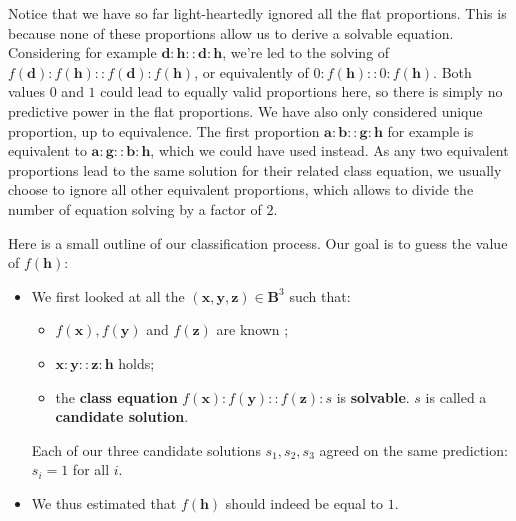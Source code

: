 Notice that we have so far light-heartedly ignored  all the flat proportions.
This is because none of these proportions allow us to derive a solvable
equation. Considering for example $\mathbf{d} : \mathbf{h} :: \mathbf{d} :
\mathbf{h}$, we're led to the solving of $f(\mathbf{d}) : f(\mathbf{h}) ::
f(\mathbf{d}) : f(\mathbf{h})$, or equivalently of $0 : f(\mathbf{h}) :: 0 :
f(\mathbf{h})$. Both values $0$ and $1$ could lead to equally valid proportions
here, so there is simply no predictive power in the flat proportions. We have
also only considered unique proportion, up to equivalence. The first proportion
$\mathbf{a} : \mathbf{b} :: \mathbf{g} : \mathbf{h}$ for example is equivalent
to $\mathbf{a} : \mathbf{g} :: \mathbf{b} : \mathbf{h}$, which we could have
used instead. As any two equivalent proportions lead to the same solution for
their related class equation, we usually choose to ignore all other equivalent
proportions, which allows to divide the number of equation solving by a factor
of $2$.

Here is a small outline of our classification process. Our goal is to guess the
value of $f(\mathbf{h})$:

\begin{itemize}
  \item We first looked at all the $(\mathbf{x}, \mathbf{y}, \mathbf{z}) \in
    \mathbf{B}^3$ such that:
    \begin{itemize}
      \item $f(\mathbf{x}), f(\mathbf{y})$ and $f(\mathbf{z})$ are known ;
      \item $\mathbf{x}:\mathbf{y}::\mathbf{z}:\mathbf{h}$ holds;
      \item the \textbf{class equation} $f(\mathbf{x}) :f(\mathbf{y}) ::
        f(\mathbf{z}) :s$ is \textbf{solvable}. $s$ is called a
        \textbf{candidate solution}.
    \end{itemize}
    Each of our three candidate solutions $s_1, s_2, s_3$ agreed on the same prediction:
    $s_i = 1$ for all $i$.
  \item We thus estimated that $f(\mathbf{h})$ should indeed be equal to $1$.
\end{itemize}


